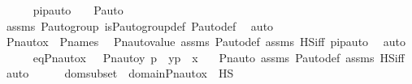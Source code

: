\begin{isabellebody}
\isanewline
\ \ \ \ \isamarkupfalse%
\ pi{\isacharunderscore}{\kern0pt}pauto\ {\isacharcolon}{\kern0pt}\ {\isachardoublequoteopen}{\isasympi}\ {\isasymin}\ P{\isacharunderscore}{\kern0pt}auto{\isachardoublequoteclose}\ \isanewline
\ \ \ \ \ \ \isamarkupfalse%
\ assms\ {\isasymG}{\isacharunderscore}{\kern0pt}P{\isacharunderscore}{\kern0pt}auto{\isacharunderscore}{\kern0pt}group\ is{\isacharunderscore}{\kern0pt}P{\isacharunderscore}{\kern0pt}auto{\isacharunderscore}{\kern0pt}group{\isacharunderscore}{\kern0pt}def\ P{\isacharunderscore}{\kern0pt}auto{\isacharunderscore}{\kern0pt}def\ \isamarkupfalse%
\ auto\ \isanewline
\isanewline
\ \ \ \ \isamarkupfalse%
\ {\isachardoublequoteopen}Pn{\isacharunderscore}{\kern0pt}auto{\isacharparenleft}{\kern0pt}{\isasympi}{\isacharparenright}{\kern0pt}{\isacharbackquote}{\kern0pt}x\ {\isasymin}\ P{\isacharunderscore}{\kern0pt}names{\isachardoublequoteclose}\ \isamarkupfalse%
\ Pn{\isacharunderscore}{\kern0pt}auto{\isacharunderscore}{\kern0pt}value\ assms\ P{\isacharunderscore}{\kern0pt}auto{\isacharunderscore}{\kern0pt}def\ assms{}\ HS{\isacharunderscore}{\kern0pt}iff\ pi{\isacharunderscore}{\kern0pt}pauto\ \isamarkupfalse%
\ auto\isanewline
\isanewline
\ \ \ \ \isamarkupfalse%
\ eq{\isacharcolon}{\kern0pt}{\isachardoublequoteopen}Pn{\isacharunderscore}{\kern0pt}auto{\isacharparenleft}{\kern0pt}{\isasympi}{\isacharparenright}{\kern0pt}{\isacharbackquote}{\kern0pt}x\ {\isacharequal}{\kern0pt}\ {\isacharbraceleft}{\kern0pt}\ {\isacharless}{\kern0pt}Pn{\isacharunderscore}{\kern0pt}auto{\isacharparenleft}{\kern0pt}{\isasympi}{\isacharparenright}{\kern0pt}{\isacharbackquote}{\kern0pt}y{\isacharcomma}{\kern0pt}\ {\isasympi}{\isacharbackquote}{\kern0pt}p{\isachargreater}{\kern0pt}\ {\isachardot}{\kern0pt}\ {\isacharless}{\kern0pt}y{\isacharcomma}{\kern0pt}p{\isachargreater}{\kern0pt}\ {\isasymin}\ x\ {\isacharbraceright}{\kern0pt}{\isachardoublequoteclose}\ \isamarkupfalse%
\ Pn{\isacharunderscore}{\kern0pt}auto\ assms\ P{\isacharunderscore}{\kern0pt}auto{\isacharunderscore}{\kern0pt}def\ assms{}\ HS{\isacharunderscore}{\kern0pt}iff\ \isamarkupfalse%
\ auto\isanewline
\ \ \ \ \isamarkupfalse%
\ domsubset\ {\isacharcolon}{\kern0pt}\ {\isachardoublequoteopen}domain{\isacharparenleft}{\kern0pt}Pn{\isacharunderscore}{\kern0pt}auto{\isacharparenleft}{\kern0pt}{\isasympi}{\isacharparenright}{\kern0pt}{\isacharbackquote}{\kern0pt}x{\isacharparenright}{\kern0pt}\ {\isasymsubseteq}\ HS{\isachardoublequoteclose}\ \isanewline

\end{isabellebody}
